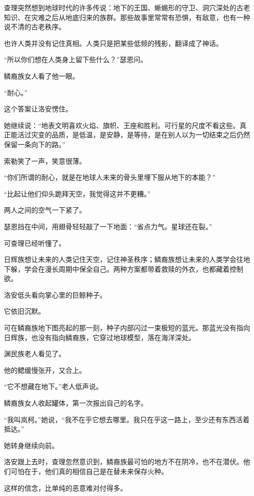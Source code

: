 查理突然想到地球时代的许多传说：地下的王国、蜥蜴形的守卫、洞穴深处的古老知识、在灾难之后从地底归来的族群。那些故事里常常有恐惧，有敌意，也有一种说不清的古老秩序。

也许人类并没有记住真相。人类只是把某些低频的残影，翻译成了神话。

“所以你们想在人类身上留下些什么？”瑟恩问。

鳞裔族女人看了他一眼。

“耐心。”

这个答案让洛安愣住。

她继续说：“地表文明喜欢火焰、旗帜、王座和胜利。可行星的尺度不看这些。真正能活过灾变的品质，是低温，是安静，是等待，是在别人以为一切结束之后仍然保留一条向下的路。”

索勒笑了一声，笑意很薄。

“你们所谓的耐心，就是在地球人未来的骨头里埋下服从地下的本能？”

“比起让他们仰头跪拜天空，我觉得这并不更糟。”

两人之间的空气一下紧了。

瑟恩挡在中间，用翅骨轻轻敲了一下地面：“省点力气。星球还在裂。”

可查理已经听懂了。

日辉族想让未来的人类记住天空，记住神圣秩序；鳞裔族想让未来的人类学会往地下躲，学会在漫长周期中保全自己。两种方案都带着救赎的外衣，也都藏着控制欲。

洛安低头看向掌心里的巨鲸种子。

它依旧沉默。

可在鳞裔族地下图亮起的那一刻，种子内部闪过一束极短的蓝光。那蓝光没有指向日辉族，也没有指向鳞裔族，它穿过地球模型，落在海洋深处。

渊民族老人看见了。

他的鳃缓慢张开，又合上。

“它不想藏在地下。”老人低声说。

鳞裔族女人收起罐体，第一次报出自己的名字。

“我叫岚柯。”她说，“我不在乎它想去哪里。我只在乎这一路上，至少还有东西活着抵达。”

她转身继续向前。

洛安跟上去时，查理忽然意识到，鳞裔族最可怕的地方不在阴冷，也不在潜伏。他们可怕在于，他们真的相信自己是在替未来保存火种。

这样的信念，比单纯的恶意难对付得多。
